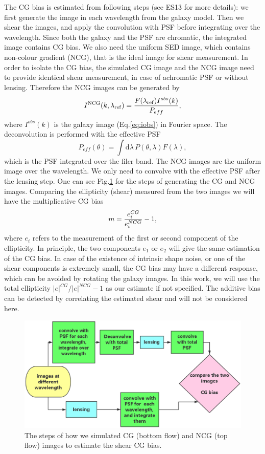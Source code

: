 \documentclass[useAMS,usenatbib]{mn2e}
\renewcommand{\d}{\mathrm{d}}
\newcommand{\be}{\begin{equation}}
\newcommand{\ee}{\end{equation}}
\begin{document}
The CG bias is estimated from following steps (see ES13 for more
details): we first generate the image in each wavelength from the
galaxy model. Then we shear the images, and apply the convolution with
PSF before integrating over the wavelength. Since both the galaxy and
the PSF are chromatic, the integrated image contains CG bias. We also
need the uniform SED image, which contains non-colour gradient (NCG),
that is the ideal image for shear measurement. In order to isolate the
CG bias, the simulated CG image and the NCG image need to provide
identical shear measurement, in case of achromatic PSF or without
lensing. Therefore the NCG images can be generated by
%
\be
I^{\rm NCG}(k, \lambda_{\rm ref}) = \dfrac{F(\lambda_{\rm ref}) I^{obs}(k)}
{P_{eff}},
\ee
%
where $I^{obs}(k)$ is the galaxy image (Eq.\ref{eq:iobs}) in Fourier space.
The deconvolution is performed with the effective PSF
%
\be
P_{eff}(\theta) = \int \d \lambda\, P(\theta,\lambda) F(\lambda),
\ee
%
which is the PSF integrated over the filer band.
The NCG images are the uniform image over the wavelength. We only
need to convolve with the effective PSF after the lensing step. One
can see Fig.\ref{fig:flowchart} for the steps of generating the CG and
NCG images.
%
Comparing the ellipticity (shear) measured from the two images we will
have the multiplicative CG bias \citep{2006MNRAS.368.1323H}
%
\be
m= {e_i^{CG} \over e_i^{NCG} }-1,
\ee
%
where $e_i$ refers to the measurement of the first or second component
of the ellipticity. In principle, the two components $e_1$ or $e_2$
will give the same estimation of the CG bias. In case of the existence
of intrinsic shape noise, or one of the shear components is extremely
small, the CG bias may have a different response, which can be avoided by
rotating the galaxy images. In this work, we will use the total
ellipticity $|e|^{CG}/|e|^{NCG}-1$ as our estimate if not
specified. The additive bias can be detected by correlating the
estimated shear and will not be considered here.
%
\begin{figure}
\includegraphics[width=12.5cm]{colourg.eps}
\caption{The steps of how we simulated CG (bottom flow) and NCG (top
  flow) images to estimate the shear CG bias.}
\label{fig:flowchart}
\end{figure}
%
\end{document}
